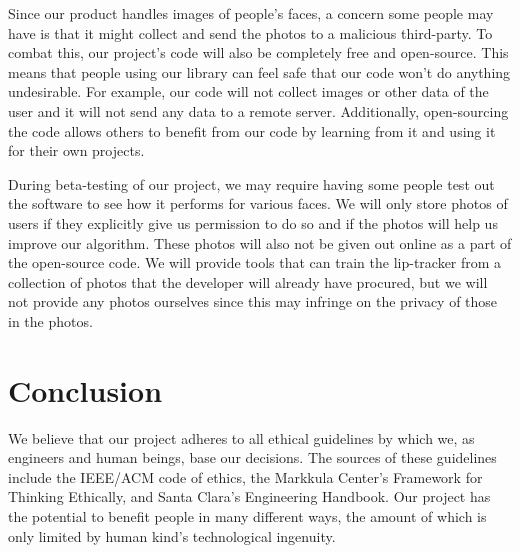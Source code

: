 Since our product handles images of people's faces, a concern some people may have is that it might collect and send the photos to a malicious third-party. To combat this, our project's code will also be completely free and open-source. This means that people using our library can feel safe that our code won't do anything undesirable. For example, our code will not collect images or other data of the user and it will not send any data to a remote server. Additionally, open-sourcing the code allows others to benefit from our code by learning from it and using it for their own projects. 

During beta-testing of our project, we may require having some people test out the software to see how it performs for various faces. We will only store photos of users if they explicitly give us permission to do so and if the photos will help us improve our algorithm. These photos will also not be given out online as a part of the open-source code. We will provide tools that can train the lip-tracker from a collection of photos that the developer will already have procured, but we will not provide any photos ourselves since this may infringe on the privacy of those in the photos.

\section{Conclusion} 
We believe that our project adheres to all ethical guidelines by which we, as engineers and human beings, base our decisions. The sources of these guidelines include the IEEE/ACM code of ethics, the Markkula Center's Framework for Thinking Ethically, and Santa Clara's Engineering Handbook. Our project has the potential to benefit people in many different ways, the amount of which is only limited by human kind's technological ingenuity.
